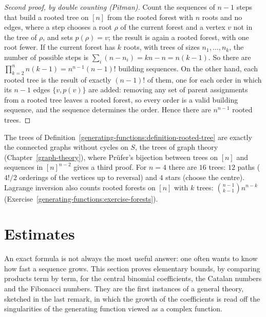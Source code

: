 \begin{proof}[Second proof, by double counting (Pitman)]
Count the sequences of $n - 1$ steps that build a rooted tree on $[n]$ from the rooted forest with $n$ roots and no edges, where a step chooses a root $\rho$ of the current forest and a vertex $v$
not in the tree of $\rho$, and sets $p(\rho) = v$; the result is again a rooted forest, with one root fewer. If the current forest has $k$ roots, with trees of sizes $n_1, \ldots, n_k$, the number of
possible steps is $\sum_i(n - n_i) = kn - n = n(k - 1)$. So there are $\prod_{k=2}^{n}n(k - 1) = n^{n-1}(n - 1)!$ building sequences. On the other hand, each rooted tree is the result of exactly
$(n - 1)!$ of them, one for each order in which its $n - 1$ edges $\{v, p(v)\}$ are added: removing any set of parent assignments from a rooted tree leaves a rooted forest, so every order is a valid
building sequence, and the sequence determines the order. Hence there are $n^{n-1}$ rooted trees.
\end{proof}

\begin{remark}\label{generating-functions:remark-cayley}
The trees of Definition~\ref{generating-functions:definition-rooted-tree} are exactly the connected graphs without cycles on $S$, the trees of graph theory (Chapter~\ref{graph-theory}), where
Pr\"ufer's bijection between trees on $[n]$ and sequences in $[n]^{n-2}$ gives a third proof. For $n = 4$ there are $16$ trees: $12$ paths ($4!/2$ orderings of the vertices up to reversal) and $4$
stars (choose the centre). Lagrange inversion also counts rooted forests on $[n]$ with $k$ trees: $\binom{n - 1}{k - 1}n^{n-k}$ (Exercise~\ref{generating-functions:exercise-forests}).
\end{remark}

\section{Estimates}\label{generating-functions:section-estimates}

An exact formula is not always the most useful answer: one often wants to know how fast a sequence grows. This section proves elementary bounds, by comparing products term by term, for the central
binomial coefficients, the Catalan numbers and the Fibonacci numbers. They are the first instances of a general theory, sketched in the last remark, in which the growth of the coefficients is read
off the singularities of the generating function viewed as a complex function.

